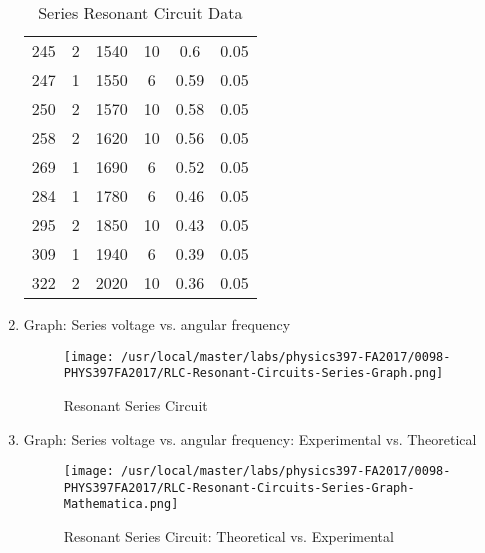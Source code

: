 \begin{enumerate}[resume]
\begin{table}[h]
\begin{tabular}{|c|c|c|c|c|c|}
245 & 2 & 1540 & 10 & 0.6  & 0.05\\
247 & 1 & 1550 & 6  & 0.59 & 0.05\\
250 & 2 & 1570 & 10 & 0.58 & 0.05\\
258 & 2 & 1620 & 10 & 0.56 & 0.05\\
269 & 1 & 1690 & 6  & 0.52 & 0.05\\
284 & 1 & 1780 & 6  & 0.46 & 0.05\\
295 & 2 & 1850 & 10 & 0.43 & 0.05\\
309 & 1 & 1940 & 6  & 0.39 & 0.05\\
322 & 2 & 2020 & 10 & 0.36 & 0.05\\
\hline
\end{tabular}
\label{tbl:RLCSeries}
\caption{Series Resonant Circuit Data}
\end{table}

\item Graph: Series voltage vs. angular frequency
  \begin{figure}[h!]
    \texttt{[image: /usr/local/master/labs/physics397-FA2017/0098-PHYS397FA2017/RLC-Resonant-Circuits-Series-Graph.png]}
    \caption{Resonant Series Circuit}
    \label{pic:RLCseries}
  \end{figure}
\item Graph: Series voltage vs. angular frequency: Experimental vs. Theoretical
  \begin{figure}[h!]
    \center
    \texttt{[image: /usr/local/master/labs/physics397-FA2017/0098-PHYS397FA2017/RLC-Resonant-Circuits-Series-Graph-Mathematica.png]}
    \caption{Resonant Series Circuit: Theoretical vs. Experimental}
    \label{pic:RLCseriesMathematica}
  \end{figure}


\end{enumerate}
